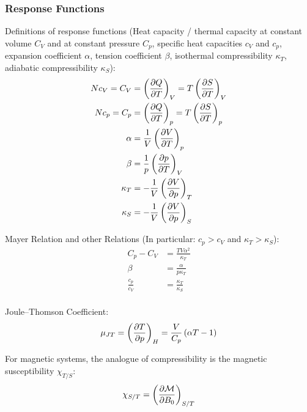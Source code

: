 		\subsubsection{Response Functions}
			\noindent
			Definitions of response functions (Heat capacity / thermal capacity at constant volume $C_V$ and at constant pressure $C_p$, specific heat capacities $c_V$ and $c_p$, expansion coefficient $\alpha$, tension coefficient $\beta$, isothermal compressibility $\kappa_T$, adiabatic compressibility $\kappa_S$):
			\begin{equation}
				\begin{aligned}
					N c_V = C_V &= \left( \pdv{Q}{T} \right)_V = T \left( \pdv{S}{T} \right)_V \\
					N c_p = C_p &= \left( \pdv{Q}{T} \right)_p = T \left( \pdv{S}{T} \right)_p \\
					\alpha &= \frac{1}{V} \left( \pdv{V}{T} \right)_p \\
					\beta &= \frac{1}{p} \left( \pdv{p}{T} \right)_V \\
					\kappa_T &= -\frac{1}{V} \left( \pdv{V}{p} \right)_T \\
					\kappa_S &= -\frac{1}{V} \left( \pdv{V}{p} \right)_S \\
				\end{aligned}
			\end{equation}

			\noindent
			Mayer Relation and other Relations  (In particular: $c_p > c_V$ and $\kappa_T > \kappa_S$):
			\begin{equation}
				\begin{aligned}
					C_p - C_V &= \frac{TV\alpha^2}{\kappa_T} \\
					\beta &= \frac{\alpha}{p \kappa_T} \\
					\frac{c_p}{c_V} &= \frac{\kappa_T}{\kappa_S} \\
				\end{aligned}
			\end{equation}

			\noindent
			Joule--Thomson Coefficient:
			\begin{equation}
				\mu_{JT} = \left( \pdv{T}{p} \right)_H = \frac{V}{C_p}\left(\alpha T - 1\right)
			\end{equation}

			\noindent
			For magnetic systems, the analogue of compressibility is the magnetic susceptibility $\chi_{T/S}$:
			\begin{equation}
				\chi_{S/T} = \left(\pdv{\mathcal{M}}{B_0}\right)_{S/T}
			\end{equation}

